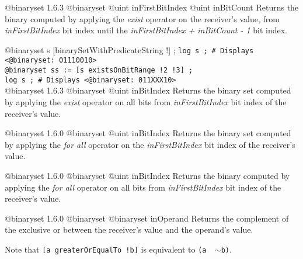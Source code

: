 {@binaryset}
{1.6.3}
{@binaryset}
{@uint inFirstBitIndex}
{@uint inBitCount}
{Returns the binary computed by applying the \emph{exist} operator on the receiver's value, from \emph{inFirstBitIndex} bit index until the \emph{inFirstBitIndex + inBitCount - 1} bit index.}
{}


\exempleUneLigne
{}
{@binaryset s [binarySetWithPredicateString !\textquotedbl] ;}
\texttt{log s ; \# Displays <@binaryset:~01110010>}\\
\texttt{@binaryset ss := [s existsOnBitRange !2 !3] ;}\\
\texttt{log s ; \# Displays <@binaryset:~011XXX10>}\\







{@binaryset}
{1.6.3}
{@binaryset}
{@uint inBitIndex}
{Returns the binary set computed by applying the \emph{exist} operator on all bits from \emph{inFirstBitIndex} bit index of the receiver's value.}
{}







{@binaryset}
{1.6.0}
{@binaryset}
{@uint inBitIndex}
{Returns the binary set computed by applying the \emph{for all} operator on the \emph{inFirstBitIndex} bit index of the receiver's value.}
{}







{@binaryset}
{1.6.0}
{@binaryset}
{@uint inBitIndex}
{Returns the binary computed by applying the \emph{for all} operator on all bits from \emph{inFirstBitIndex} bit index of the receiver's value.}
{}








{@binaryset}
{1.6.0}
{@binaryset}
{@binaryset inOperand}
{Returns the complement of the exclusive or between the receiver's value and the operand's value.}
{}

Note that \texttt{[a greaterOrEqualTo !b]} is equivalent to \texttt{(a \textbar ~$\sim$b)}.








